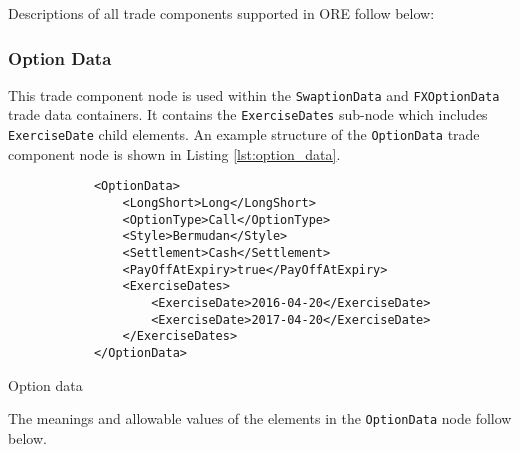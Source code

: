 Descriptions of all trade components supported in ORE follow below:

\subsubsection{Option Data}
\label{ss:option_data} 
This trade component node is used within the \lstinline!SwaptionData! and \lstinline!FXOptionData! trade data
containers. It contains the \lstinline!ExerciseDates! sub-node which includes \lstinline!ExerciseDate! child
elements. An example structure of the \lstinline!OptionData! trade component node is shown in Listing
\ref{lst:option_data}.

\begin{listing}[H]
\begin{verbatim}
            <OptionData>
                <LongShort>Long</LongShort>
                <OptionType>Call</OptionType>
                <Style>Bermudan</Style>
                <Settlement>Cash</Settlement> 
                <PayOffAtExpiry>true</PayOffAtExpiry>
                <ExerciseDates>
                    <ExerciseDate>2016-04-20</ExerciseDate>
                    <ExerciseDate>2017-04-20</ExerciseDate>
                </ExerciseDates>
            </OptionData>
\end{verbatim}
\caption{Option data}
\label{lst:option_data}
\end{listing}

The meanings and allowable values of the elements in the \lstinline!OptionData! node follow below.


